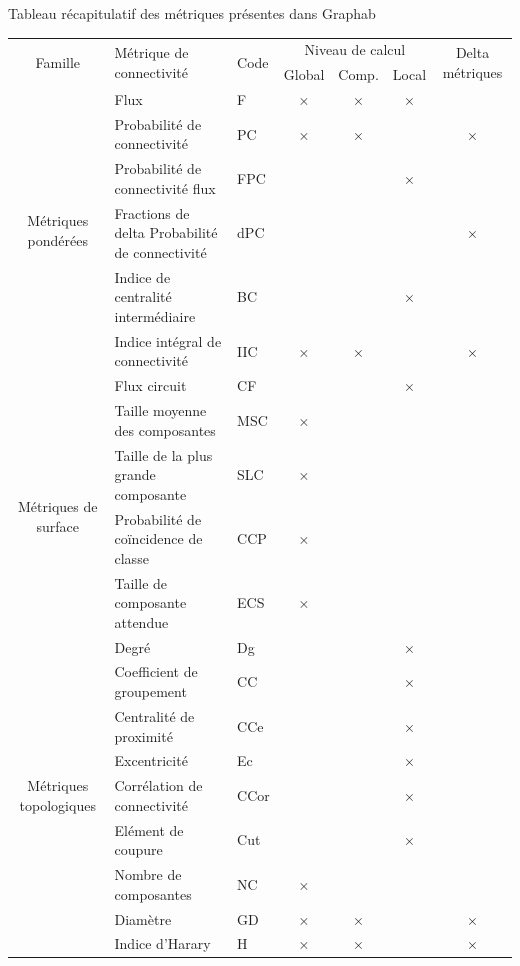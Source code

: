 \documentclass{article}
\begin{document}
Tableau récapitulatif des métriques présentes dans Graphab
\begin{table}[H]
	\begin{tabular}{|c|p{7cm}|l|c|c|c|c|}
		\hline
		\multirow{2}{*}{Famille} & \multirow{2}{*}{Métrique de connectivité} & \multirow{2}{*}{Code} & \multicolumn{3}{m{3cm}|}{\centering Niveau de calcul} & \multirow{2}{1.5cm}{Delta métriques}\\
		\hhline{~~~---~}
		&  &  & Global & Comp. & Local & \\
		\hline
		\multirow{6}{2cm}{Métriques pondérées}
		& Flux & F & × & × & × & \\
		& Probabilité de connectivité & PC & × & × &  & ×\\
		& Probabilité de connectivité flux & FPC &  &  & × & \\
		& Fractions de delta Probabilité de connectivité & dPC &  &  &  & ×\\
		& Indice de centralité intermédiaire & BC &  &  & × & \\
		& Indice intégral de connectivité & IIC & × & × &  & ×\\
		& Flux circuit & CF &  &  & × & \\
		\hline
		\multirow{4}{2cm}{Métriques de surface}
		& Taille moyenne des composantes & MSC & × &  &  & \\
		& Taille de la plus grande composante & SLC & × &  &  & \\
		& Probabilité de coïncidence de classe & CCP & × &  &  & \\
		& Taille de composante attendue & ECS & × &  &  & \\
		\hline
		\multirow{9}{2cm}{Métriques topologiques}
		& Degré & Dg &  &  & × & \\
		& Coefficient de groupement & CC &  &  & × & \\
		& Centralité de proximité & CCe &  &  & × & \\
		& Excentricité & Ec &  &  & × & \\
		& Corrélation de connectivité & CCor &  &  & × & \\
		& Elément de coupure & Cut &  &  & × & \\
		& Nombre de composantes & NC & × &  &  & \\
		& Diamètre & GD & × & × &  & ×\\
		& Indice d’Harary & H & × & × &  & ×\\
		\hline
	\end{tabular}

\end{table}
\end{document}
